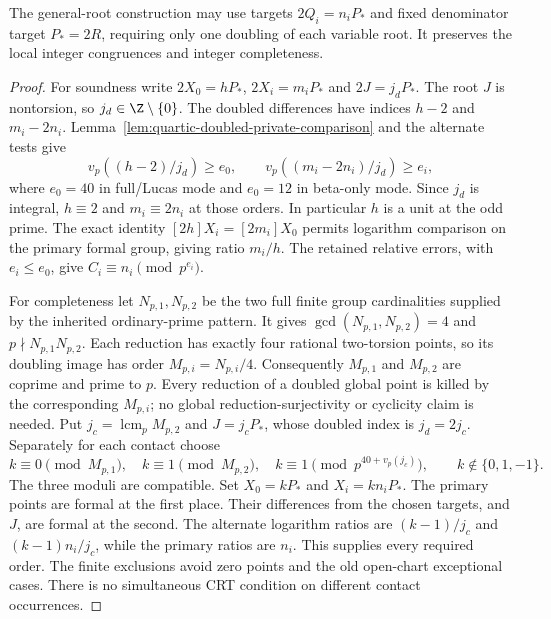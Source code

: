 \begin{lemma}
\label{lem:quartic-target-two}
The general-root construction may use targets $2Q_i=n_iP_*$ and fixed
denominator target $P_*=2R$, requiring only one doubling of each variable
root. It preserves the local integer congruences and integer completeness.
\end{lemma}
\begin{proof}
For soundness write $2X_0=hP_*$, $2X_i=m_iP_*$ and $2J=j_dP_*$.
The root $J$ is nontorsion, so $j_d\in\Z\setminus\{0\}$.
The doubled differences have indices $h-2$ and $m_i-2n_i$.
Lemma~\ref{lem:quartic-doubled-private-comparison} and the alternate
tests give
\[
 v_p((h-2)/j_d)\ge e_0,\qquad
 v_p((m_i-2n_i)/j_d)\ge e_i,
\]
where $e_0=40$ in full/Lucas mode and $e_0=12$ in beta-only mode.
Since $j_d$ is integral, $h\equiv2$ and $m_i\equiv2n_i$ at those orders.
In particular $h$ is a unit at the odd prime. The exact identity
$[2h]X_i=[2m_i]X_0$ permits logarithm comparison on the primary formal
group, giving ratio $m_i/h$. The retained relative errors, with
$e_i\le e_0$, give $C_i\equiv n_i\pmod{p^{e_i}}$.

For completeness let $N_{p,1},N_{p,2}$ be the two full finite group
cardinalities supplied by the inherited ordinary-prime pattern. It gives
$\gcd(N_{p,1},N_{p,2})=4$ and $p\nmid N_{p,1}N_{p,2}$. Each reduction
has exactly four rational two-torsion points, so its doubling image has
order $M_{p,i}=N_{p,i}/4$. Consequently $M_{p,1}$ and $M_{p,2}$ are
coprime and prime to $p$. Every reduction of a doubled global point is
killed by the corresponding $M_{p,i}$; no global reduction-surjectivity
or cyclicity claim is needed.
Put $j_c=\operatorname{lcm}_p M_{p,2}$ and $J=j_cP_*$, whose doubled
index is $j_d=2j_c$. Separately for each contact choose
\[
 k\equiv0\pmod{M_{p,1}},\quad
 k\equiv1\pmod{M_{p,2}},\quad
 k\equiv1\pmod{p^{40+v_p(j_c)}},\qquad k\notin\{0,1,-1\}.
\]
The three moduli are compatible. Set $X_0=kP_*$ and $X_i=kn_iP_*$.
The primary points are formal at the first place. Their differences from
the chosen targets, and $J$, are formal at the second. The alternate
logarithm ratios are $(k-1)/j_c$ and $(k-1)n_i/j_c$, while the primary
ratios are $n_i$. This supplies every required order. The finite exclusions
avoid zero points and the old open-chart exceptional cases. There is no
simultaneous CRT condition on different contact occurrences.
\end{proof}

